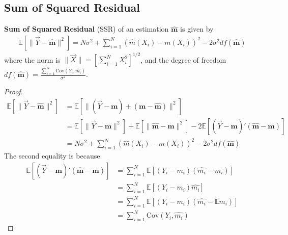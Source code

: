 \documentclass[11pt]{elegantbook}
\begin{document}
\subsection*{Sum of Squared Residual}
\begin{proposition}
    \textbf{Sum of Squared Residual} (SSR) of an estimation $\hat{\boldsymbol{m}}$ is given by
    \begin{equation}
        \begin{aligned}
            \mathbb{E}\left[\|\vec{Y}-\hat{\boldsymbol{m}}\|^2\right]=N\sigma^2+\sum_{i=1}^N\left(\hat{m}(X_i)-m(X_i)\right)^2-2\sigma^2 df(\hat{\boldsymbol{m}})
        \end{aligned}
        \tag{SSR}
        \label{SSR}
    \end{equation}
    where the norm is $\|\vec{X}\|=\left[\sum_{i=1}^N X_i^2\right]^{1/2}$, and the degree of freedom $df(\hat{\boldsymbol{m}})=\frac{\sum_{i=1}^N \text{Cov}(Y_i,\hat{m_i})}{\sigma^2}$.
\end{proposition}
\begin{proof}
    \begin{equation}
        \begin{aligned}
            \mathbb{E}\left[\|\vec{Y}-\hat{\boldsymbol{m}}\|^2\right]&=\mathbb{E}\left[\|(\vec{Y}-\boldsymbol{m})+(\boldsymbol{m}-\hat{\boldsymbol{m}})\|^2\right]\\
            &=\mathbb{E}\left[\|\vec{Y}-\boldsymbol{m}\|^2\right]+\mathbb{E}\left[\|\hat{\boldsymbol{m}}-\boldsymbol{m}\|^2\right]-2 \mathbb{E}\left[(\vec{Y}-\boldsymbol{m})'(\hat{\boldsymbol{m}}-\boldsymbol{m})\right]\\
            &=N\sigma^2+\sum_{i=1}^N\left(\hat{m}(X_i)-m(X_i)\right)^2-2\sigma^2 df(\hat{\boldsymbol{m}})
        \end{aligned}
        \nonumber
    \end{equation}
    The second equality is because
    \begin{equation}
        \begin{aligned}
            \mathbb{E}\left[(\vec{Y}-\boldsymbol{m})'(\hat{\boldsymbol{m}}-\boldsymbol{m})\right]&=\sum_{i=1}^N \mathbb{E}\left[(Y_i-m_i)(\hat{m_i}-m_i)\right]\\
            &=\sum_{i=1}^N \mathbb{E}\left[(Y_i-m_i)\hat{m_i}\right]\\
            &=\sum_{i=1}^N \mathbb{E}\left[(Y_i-m_i)(\hat{m_i}-\mathbb{E}m_i)\right]\\
            &=\sum_{i=1}^N \text{Cov}(Y_i,\hat{m_i})
        \end{aligned}
        \nonumber
    \end{equation}
\end{proof}
\end{document}
